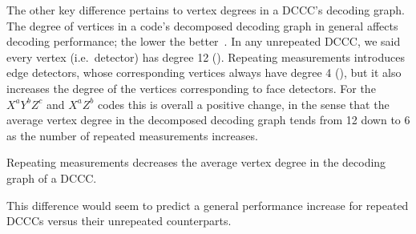 The other key difference pertains to vertex degrees in a DCCC's decoding graph.
The degree of vertices in a code's decomposed decoding graph in general affects decoding performance; the lower the better~\cite{OscarSubsystemGaugeFixing}.
In any unrepeated DCCC, we said every vertex (i.e.\ detector) has degree 12 ().
Repeating measurements introduces edge detectors, whose corresponding vertices always have degree 4 (),
but it also increases the degree of the vertices corresponding to face detectors.
For the $X^a Y^b Z^c$ and $X^a Z^b$ codes this is overall a positive change,
in the sense that the average vertex degree in the decomposed decoding graph tends from 12 down to 6 as the number of repeated measurements increases.

\begin{difference}\label{dif:repeating_decoding_graph_degrees}
    Repeating measurements decreases the average vertex degree in the decoding graph of a DCCC.
\end{difference}

This difference would seem to predict a general performance increase for repeated DCCCs versus their unrepeated counterparts.

